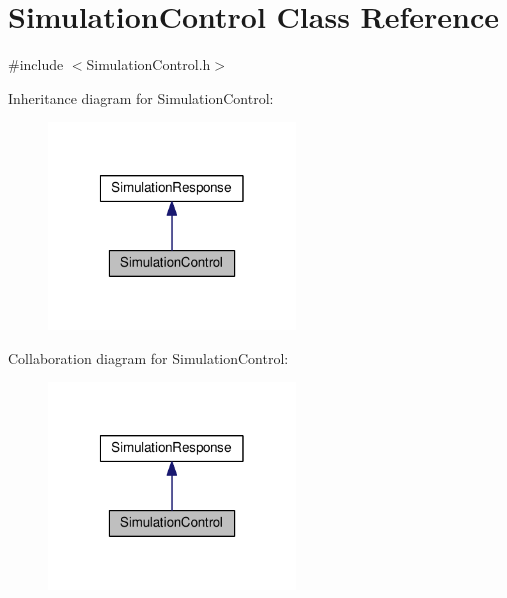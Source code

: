 \hypertarget{class_simulation_control}{\section{Simulation\-Control Class Reference}
\label{class_simulation_control}
}


{\ttfamily \#include $<$Simulation\-Control.\-h$>$}



Inheritance diagram for Simulation\-Control\-:\nopagebreak
\begin{figure}[H]
\begin{center}
\leavevmode
\includegraphics[width=186pt]{class_simulation_control__inherit__graph}
\end{center}
\end{figure}


Collaboration diagram for Simulation\-Control\-:\nopagebreak
\begin{figure}[H]
\begin{center}
\leavevmode
\includegraphics[width=186pt]{class_simulation_control__coll__graph}
\end{center}
\end{figure}
